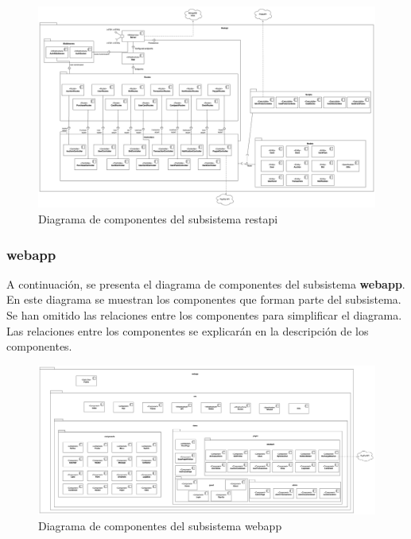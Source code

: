     \begin{landscape}
    \begin{figure}[H]
        \hypertarget{fig:6_5_Diagrama-Componentes-restapi}{}
        \centering
        \includegraphics[width=1\linewidth]{figures/6-Analisis/6-Clases/6_5-Componentes-restapi.png}
        \caption{Diagrama de componentes del subsistema restapi}
        \label{fig:6_5_Diagrama-Componentes-restapi}
    \end{figure}
    \end{landscape}

\newpage





\subsubsection{webapp}
A continuación, se presenta el diagrama de componentes del subsistema \textbf{webapp}. En este diagrama se muestran los componentes que forman parte del subsistema.
Se han omitido las relaciones entre los componentes para simplificar el diagrama. Las relaciones entre los componentes se explicarán en la descripción de los componentes.
\begin{landscape}
    \begin{figure}[H]
        \hypertarget{fig:6_5_Diagrama-Componentes-webapp}{}
        \centering
        \includegraphics[width=1\linewidth]{figures/6-Analisis/6-Clases/6_5-Componentes-webapp.png}
        \caption{Diagrama de componentes del subsistema webapp}
        \label{fig:6_5_Diagrama-Componentes-webapp}
    \end{figure}
    \end{landscape}

\newpage


